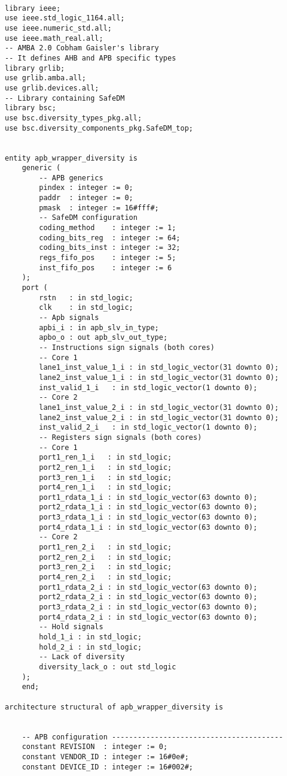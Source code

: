 \belowcaptionskip=-10pt
\begin{lstlisting}[label=ins-prot,caption=SafeDM instance example,style=vhdl,frame=none,tabsize=2]

library ieee; 
use ieee.std_logic_1164.all;
use ieee.numeric_std.all;
use ieee.math_real.all;
-- AMBA 2.0 Cobham Gaisler's library 
-- It defines AHB and APB specific types
library grlib;
use grlib.amba.all;
use grlib.devices.all;
-- Library containing SafeDM
library bsc;
use bsc.diversity_types_pkg.all;
use bsc.diversity_components_pkg.SafeDM_top;


entity apb_wrapper_diversity is
	generic (
		-- APB generics
		pindex : integer := 0;
		paddr  : integer := 0;
		pmask  : integer := 16#fff#;
		-- SafeDM configuration
		coding_method    : integer := 1;
		coding_bits_reg  : integer := 64;
		coding_bits_inst : integer := 32;
		regs_fifo_pos    : integer := 5;
		inst_fifo_pos    : integer := 6
	);
	port (
		rstn   : in std_logic;
		clk    : in std_logic;
		-- Apb signals
		apbi_i : in apb_slv_in_type;
		apbo_o : out apb_slv_out_type;
		-- Instructions sign signals (both cores)
		-- Core 1
		lane1_inst_value_1_i : in std_logic_vector(31 downto 0); 
		lane2_inst_value_1_i : in std_logic_vector(31 downto 0);  
		inst_valid_1_i   : in std_logic_vector(1 downto 0); 
		-- Core 2
		lane1_inst_value_2_i : in std_logic_vector(31 downto 0);  
		lane2_inst_value_2_i : in std_logic_vector(31 downto 0);  
		inst_valid_2_i   : in std_logic_vector(1 downto 0); 
		-- Registers sign signals (both cores)
		-- Core 1
		port1_ren_1_i   : in std_logic;
		port2_ren_1_i   : in std_logic;
		port3_ren_1_i   : in std_logic; 
		port4_ren_1_i   : in std_logic; 
		port1_rdata_1_i : in std_logic_vector(63 downto 0);   
		port2_rdata_1_i : in std_logic_vector(63 downto 0);
		port3_rdata_1_i : in std_logic_vector(63 downto 0);
		port4_rdata_1_i : in std_logic_vector(63 downto 0);
		-- Core 2
		port1_ren_2_i   : in std_logic;
		port2_ren_2_i   : in std_logic;
		port3_ren_2_i   : in std_logic; 
		port4_ren_2_i   : in std_logic; 
		port1_rdata_2_i : in std_logic_vector(63 downto 0);   
		port2_rdata_2_i : in std_logic_vector(63 downto 0);
		port3_rdata_2_i : in std_logic_vector(63 downto 0);
		port4_rdata_2_i : in std_logic_vector(63 downto 0);
		-- Hold signals
		hold_1_i : in std_logic;
		hold_2_i : in std_logic;
		-- Lack of diversity
		diversity_lack_o : out std_logic
	);
	end;

architecture structural of apb_wrapper_diversity is
	

	-- APB configuration ----------------------------------------
	constant REVISION  : integer := 0;
	constant VENDOR_ID : integer := 16#0e#;
	constant DEVICE_ID : integer := 16#002#;


\end{lstlisting}
